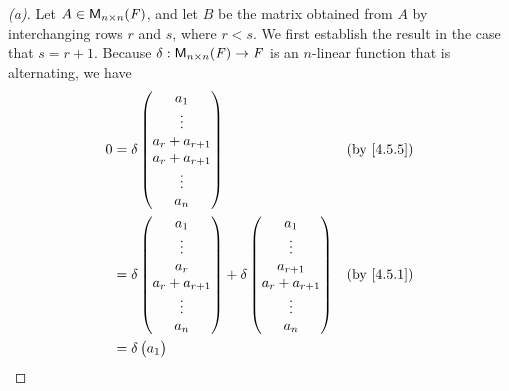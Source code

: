 \begin{proof}[(a)]
  Let \(A \in \mathsf{M}_{{n} \times n}({\mathit{F}})\), and let \(B\) be the matrix obtained from \(A\) by interchanging rows \(r\) and \(s\), where \(r < s\).
  We first establish the result in the case that \(s = r + 1\).
  Because \(\delta : \mathsf{M}_{{n} \times n}({\mathit{F}}) \to \mathit{F}\) is an \(n\)-linear function that is alternating, we have
  \begin{align*}
    0 & = \delta\begin{pmatrix}
                  a_1             \\
                  \vdots          \\
                  a_r + a_{r + 1} \\
                  a_r + a_{r + 1} \\
                  \vdots          \\
                  a_n
                \end{pmatrix}               &  & \text{(by \cref{4.5.5})}                                                     \\
      & = \delta\begin{pmatrix}
                  a_1             \\
                  \vdots          \\
                  a_r             \\
                  a_r + a_{r + 1} \\
                  \vdots          \\
                  a_n
                \end{pmatrix} + \delta\begin{pmatrix}
                                        a_1             \\
                                        \vdots          \\
                                        a_{r + 1}       \\
                                        a_r + a_{r + 1} \\
                                        \vdots          \\
                                        a_n
                                      \end{pmatrix} &  & \text{(by \cref{4.5.1})}                                             \\
      & = \delta\begin{pmatrix}
                  a_1    \\

\end{pmatrix}
\end{align*}
\end{proof}

